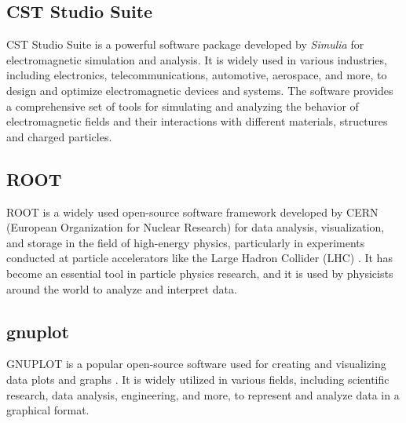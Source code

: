 \documentclass[a4paper,oneside,12pt]{report}
\numberwithin{equation}{chapter}
\begin{document}
\subsection{CST Studio Suite}
CST Studio Suite is a powerful software package developed by \textit{Simulia} for electromagnetic simulation and analysis. It is widely used in various industries, including electronics, telecommunications, automotive, aerospace, and more, to design and optimize electromagnetic devices and systems. 
The software provides a comprehensive set of tools for simulating and analyzing the behavior of electromagnetic fields and their interactions with different materials, structures and charged particles.

\subsection{ROOT}
ROOT is a widely used open-source software framework developed by CERN (European Organization for Nuclear Research) for data analysis,
visualization, and storage in the field of high-energy physics, particularly in experiments conducted at particle accelerators 
like the Large Hadron Collider (LHC) \cite{root}. It has become an essential tool in particle physics research, 
and it is used by physicists around the world to analyze and interpret data.

\subsection{gnuplot}
GNUPLOT is a popular open-source software used for creating and visualizing data plots and graphs  \cite{gnuplot}. 
It is widely utilized in various fields, including scientific research, data analysis, engineering, and more, 
to represent and analyze data in a graphical format. 

\end{document}
